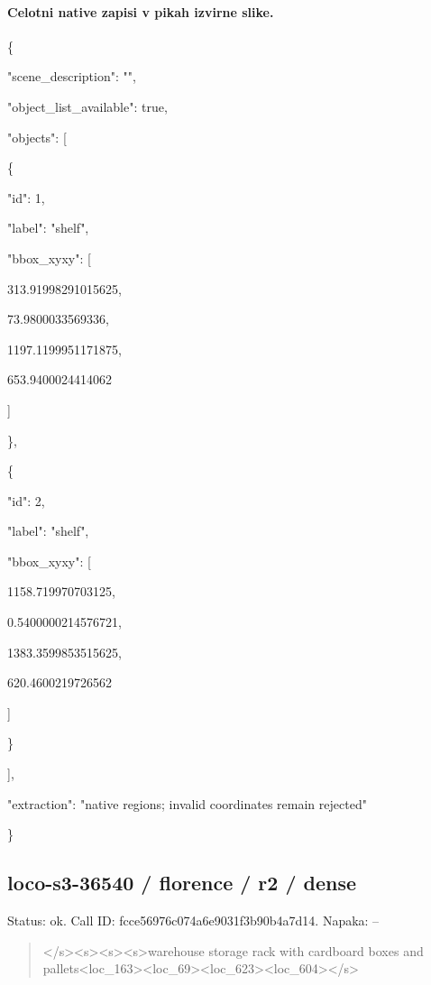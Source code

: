 \documentclass[10pt,a4paper]{article}
\begin{document}
\paragraph{Celotni native zapisi v pikah izvirne slike.}
\{\par
  "scene\_description":\allowbreak{} "",\allowbreak{}\par
  "object\_list\_available":\allowbreak{} true,\allowbreak{}\par
  "objects":\allowbreak{} [\par
    \{\par
      "id":\allowbreak{} 1,\allowbreak{}\par
      "label":\allowbreak{} "shelf",\allowbreak{}\par
      "bbox\_xyxy":\allowbreak{} [\par
        313.91998291015625,\allowbreak{}\par
        73.9800033569336,\allowbreak{}\par
        1197.1199951171875,\allowbreak{}\par
        653.9400024414062\par
      ]\par
    \},\allowbreak{}\par
    \{\par
      "id":\allowbreak{} 2,\allowbreak{}\par
      "label":\allowbreak{} "shelf",\allowbreak{}\par
      "bbox\_xyxy":\allowbreak{} [\par
        1158.719970703125,\allowbreak{}\par
        0.5400000214576721,\allowbreak{}\par
        1383.3599853515625,\allowbreak{}\par
        620.4600219726562\par
      ]\par
    \}\par
  ],\allowbreak{}\par
  "extraction":\allowbreak{} "native regions; invalid coordinates remain rejected"\par
\}
\subsection*{loco-s3-36540 / florence / r2 / dense}
Status: ok. Call ID: fcce56976c074a6e9031f3b90b4a7d14. Napaka: --
\begin{quote}\footnotesize
</s>\allowbreak{}<s>\allowbreak{}<s>\allowbreak{}<s>\allowbreak{}warehouse storage rack with cardboard boxes and pallets<loc\_163>\allowbreak{}<loc\_69>\allowbreak{}<loc\_623\allowbreak{}>\allowbreak{}<loc\_604>\allowbreak{}</s>\allowbreak{}
\end{quote}
\end{document}
